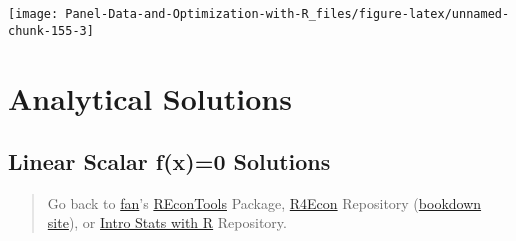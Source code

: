 \documentclass[
]{book}
\newenvironment{Shaded}{\begin{snugshade}}{\end{snugshade}}
\newcommand{\CharTok}[1]{\textcolor[rgb]{0.31,0.60,0.02}{#1}}
\newcommand{\DataTypeTok}[1]{\textcolor[rgb]{0.13,0.29,0.53}{#1}}
\newcommand{\FloatTok}[1]{\textcolor[rgb]{0.00,0.00,0.81}{#1}}
\newcommand{\KeywordTok}[1]{\textcolor[rgb]{0.13,0.29,0.53}{\textbf{#1}}}
\newcommand{\NormalTok}[1]{#1}
\newcommand{\OperatorTok}[1]{\textcolor[rgb]{0.81,0.36,0.00}{\textbf{#1}}}
\newcommand{\StringTok}[1]{\textcolor[rgb]{0.31,0.60,0.02}{#1}}
\begin{document}
\begin{Shaded}
\end{Shaded}

\begin{center}\texttt{[image: Panel-Data-and-Optimization-with-R\_files/figure-latex/unnamed-chunk-155-3]} \end{center}

\hypertarget{analytical-solutions}{%
\section{Analytical Solutions}\label{analytical-solutions}}

\hypertarget{linear-scalar-fx0-solutions}{%
\subsection{Linear Scalar f(x)=0 Solutions}\label{linear-scalar-fx0-solutions}}

\begin{quote}
Go back to \href{http://fanwangecon.github.io/}{fan}'s \href{https://fanwangecon.github.io/REconTools/}{REconTools} Package, \href{https://fanwangecon.github.io/R4Econ/}{R4Econ} Repository (\href{https://fanwangecon.github.io/R4Econ/bookdown}{bookdown site}), or \href{https://fanwangecon.github.io/Stat4Econ/}{Intro Stats with R} Repository.
\end{quote}
\end{document}
